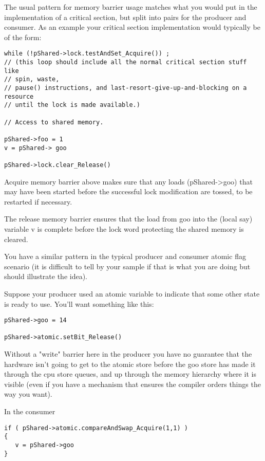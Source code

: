 The usual pattern for memory barrier usage matches what you would put in the implementation of a critical section, but split into pairs for the producer and consumer. As an example your critical section implementation would typically be of the form:

\begin{lstlisting}
while (!pShared->lock.testAndSet_Acquire()) ;
// (this loop should include all the normal critical section stuff like
// spin, waste, 
// pause() instructions, and last-resort-give-up-and-blocking on a resource 
// until the lock is made available.)

// Access to shared memory.

pShared->foo = 1 
v = pShared-> goo

pShared->lock.clear_Release()
\end{lstlisting}

Acquire memory barrier above makes sure that any loads (pShared->goo) that may have been started before the successful lock modification are tossed, to be restarted if necessary.

The release memory barrier ensures that the load from goo into the (local say) variable v is complete before the lock word protecting the shared memory is cleared.

You have a similar pattern in the typical producer and consumer atomic flag scenario (it is difficult to tell by your sample if that is what you are doing but should illustrate the idea).

Suppose your producer used an atomic variable to indicate that some other state is ready to use. You'll want something like this:

\begin{lstlisting}
pShared->goo = 14

pShared->atomic.setBit_Release()
\end{lstlisting}

Without a "write" barrier here in the producer you have no guarantee that the hardware isn't going to get to the atomic store before the goo store has made it through the cpu store queues, and up through the memory hierarchy where it is visible (even if you have a mechanism that ensures the compiler orders things the way you want).

In the consumer

\begin{lstlisting}
if ( pShared->atomic.compareAndSwap_Acquire(1,1) )
{
   v = pShared->goo 
}
\end{lstlisting}

